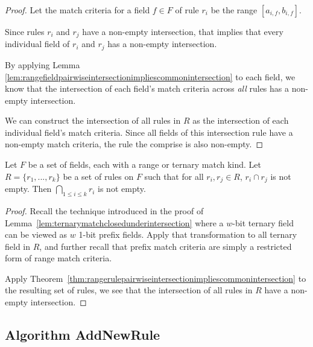 \documentclass[acmsmall]{acmart}
\begin{document}
\begin{proof}
Let the match criteria for a field $f \in F$ of rule $r_i$ be
the range $[a_{i,f}, b_{i,f}]$.

Since rules $r_i$ and $r_j$ have a non-empty intersection,
that implies that every individual field of $r_i$ and $r_j$
has a non-empty intersection.

By applying Lemma~
\ref{lem:rangefieldpairwiseintersectionimpliescommonintersection}
to each field, we know that the intersection of each field's
match criteria across {\em all} rules has a non-empty intersection.

We can construct the intersection of all rules in $R$ as
the intersection of each individual field's match criteria.
Since all fields of this intersection rule have a non-empty
match criteria, the rule the comprise is also non-empty.
\end{proof}


\begin{theorem}
\label{thm:ternaryrulepairwiseintersectionimpliescommonintersection}
Let $F$ be a set of fields, each with a range or ternary match kind.
Let $R = \{r_1, ..., r_k\}$ be a set of rules on $F$
such that for all $r_i, r_j \in R$, $r_i \cap r_j$ is not empty.
Then $\bigcap_{1 \leq i \leq k} r_i$ is not empty.
\end{theorem}

\begin{proof}
Recall the technique introduced in the proof of
Lemma~\ref{lem:ternarymatchclosedunderintersection}
where a $w$-bit ternary field can be viewed as
$w$ 1-bit prefix fields.
Apply that transformation to all ternary field in $R$,
and further recall that prefix match criteria are simply a restricted
form of range match criteria.

Apply Theorem~\ref{thm:rangerulepairwiseintersectionimpliescommonintersection}
to the resulting set of rules,
we see that the intersection of all rules in $R$
have a non-empty intersection.
\end{proof}


\subsection{Algorithm AddNewRule}

\newcommand{\rulesconflict}[2]{\mathbin{\textsc{RulesConflict}({#1},{#2})}}
\newcommand{\resolverule}[2]{\mathbin{\textsc{ResolveRule}({#1},{#2})}}
\newcommand{\addnewrule}[2]{\mathbin{\textsc{AddNewRule}({#1},{#2})}}
\end{document}
